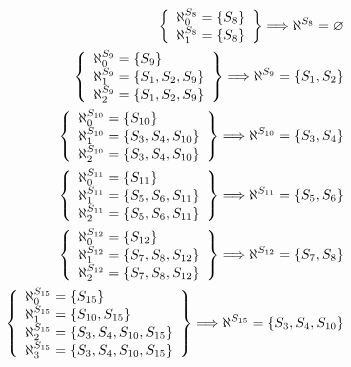 \begin{itemize}
\begin{align*}
		      \setconc{
		      \aleph^{S_8}_{0}  = \cbr{S_8}                         \\
		      \aleph^{S_8}_{1}  = \cbr{S_8}                         \\
		      }{\aleph^{S_8}  = \varnothing}                        \\
		      \setconc{
		      \aleph^{S_9}_{0}  = \cbr{S_9}                         \\
		      \aleph^{S_9}_{1}  = \cbr{S_1, S_2, S_9}               \\
		      \aleph^{S_9}_{2}  = \cbr{S_1, S_2, S_9}               \\
		      }{\aleph^{S_9}  = \cbr{S_1, S_2}}                     \\
		      \setconc{
		      \aleph^{S_{10}}_{0}  = \cbr{S_{10}}                   \\
		      \aleph^{S_{10}}_{1}  = \cbr{S_3, S_4, S_{10}}         \\
		      \aleph^{S_{10}}_{2}  = \cbr{S_3, S_4, S_{10}}         \\
		      }{\aleph^{S_{10}}  = \cbr{S_3, S_4}}                  \\
		      \setconc{
		      \aleph^{S_{11}}_{0}  = \cbr{S_{11}}                   \\
		      \aleph^{S_{11}}_{1}  = \cbr{S_5, S_6, S_{11}}         \\
		      \aleph^{S_{11}}_{2}  = \cbr{S_5, S_6, S_{11}}         \\
		      }{\aleph^{S_{11}}  = \cbr{S_5, S_6}}                  \\
		      \setconc{
		      \aleph^{S_{12}}_{0}  = \cbr{S_{12}}                   \\
		      \aleph^{S_{12}}_{1}  = \cbr{S_7, S_8, S_{12}}         \\
		      \aleph^{S_{12}}_{2}  = \cbr{S_7, S_8, S_{12}}         \\
		      }{\aleph^{S_{12}}  = \cbr{S_7, S_8}}                  \\
		      \setconc{
		      \aleph^{S_{15}}_{0}  = \cbr{S_{15}}                   \\
		      \aleph^{S_{15}}_{1}  = \cbr{S_{10}, S_{15}}           \\
		      \aleph^{S_{15}}_{2}  = \cbr{S_3, S_4, S_{10}, S_{15}} \\
		      \aleph^{S_{15}}_{3}  = \cbr{S_3, S_4, S_{10}, S_{15}} \\
		      }{\aleph^{S_{15}}  = \cbr{S_3, S_4, S_{10}}}          \\

\end{align*}
\end{itemize}
